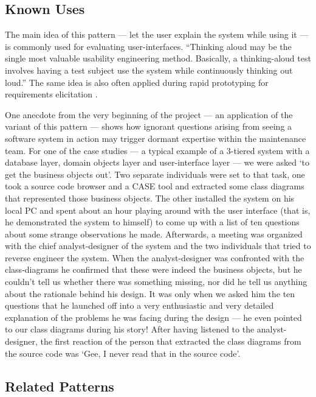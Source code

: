 \documentclass[a4paper,10pt,twoside]{book}
\begin{document}
\subsection*{Known Uses}

The main idea of this pattern --- let the user explain the system while using it --- is commonly used for evaluating user-interfaces. ``Thinking aloud may be the single most valuable usability engineering method. Basically, a thinking-aloud test involves having a test subject use the system while continuously thinking out loud.'' \cite{Niel93b} The same idea is also often applied during rapid prototyping for requirements elicitation \cite{Somm96a}.

One anecdote from the very beginning of the  project --- an application of the  variant of this pattern --- shows how ignorant questions arising from seeing a software system in action may trigger dormant expertise within the maintenance team. For one of the case studies --- a typical example of a 3-tiered system with a database layer, domain objects layer and user-interface layer --- we were asked `to get the business objects out'. Two separate individuals were set to that task, one took a source code browser and a CASE tool and extracted some class diagrams that represented those business objects. The other installed the system on his local PC and spent about an hour playing around with the user interface (that is, he demonstrated the system to himself) to come up with a list of ten questions about some strange observations he made. Afterwards, a meeting was organized with the chief analyst-designer of the system and the two individuals that tried to reverse engineer the system. When the analyst-designer was confronted with the class-diagrams he confirmed that these were indeed the business objects, but he couldn't tell us whether there was something missing, nor did he tell us anything about the rationale behind his design. It was only when we asked him the ten questions that he launched off into a very enthusiastic and very detailed explanation of the problems he was facing during the design --- he even pointed to our class diagrams during his story! After having listened to the analyst-designer, the first reaction of the person that extracted the class diagrams from the source code was `Gee, I never read that in the source code'.

\subsection*{Related Patterns}
\end{document}
